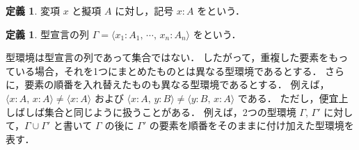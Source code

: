 \documentclass[./main]{subfiles}
\newcommand{\ocl}{\mathord{:}}
\newcommand{\textem}[1]{\textbf{\textgt{#1}}}
\newcommand{\fl}[1]{}
\newcommand{\ats}{\,}
\theoremstyle{definition}
\newtheorem{defi}[theo]{定義}
\begin{document}
\begin{defi}
変項 $ x $ と擬項 $ A $ に対し，記号 $ x \ocl\, A $ を\textem{型宣言\fl{type declaration}}という．
\end{defi}

\begin{defi}
型宣言の列 $ \varGamma = \langle x _1 \ocl\, A _1,\ats \cdots,\ats x _n \ocl\, A _n \rangle $ を\textem{型環境\fl{type context}}という．
\end{defi}

型環境は型宣言の列であって集合ではない．
したがって，重複した要素をもっている場合，それを1つにまとめたものとは異なる型環境であるとする．
さらに，要素の順番を入れ替えたものも異なる型環境であるとする．
例えば，$ \langle x \ocl\, A,\ats x \ocl\, A \rangle \ne \langle x \ocl\, A \rangle $ および $ \langle x \ocl\, A,\ats y \ocl\, B \rangle \ne \langle y \ocl\, B,\ats x \ocl\, A \rangle $ である．
ただし，便宜上しばしば集合と同じように扱うことがある．
例えば，2つの型環境 $ \varGamma,\ats \varGamma' $ に対して，$ \varGamma \cup \varGamma' $ と書いて $ \varGamma $ の後に $ \varGamma' $ の要素を順番をそのままに付け加えた型環境を表す．
\end{document}
